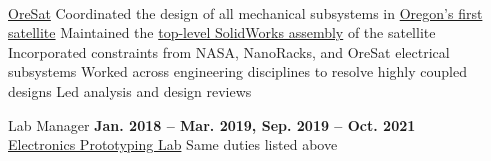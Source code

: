 \begin{innerlist}
    \\ \href{https://www.oresat.org/}{OreSat}
		\subitem Coordinated the design of all mechanical subsystems in \href{http://oresat.org/}{Oregon's first satellite}
		\subitem Maintained the \href{https://github.com/oresat/oresat-structure}{top-level SolidWorks assembly} of the satellite
		\subitem Incorporated constraints from NASA, NanoRacks, and OreSat electrical subsystems
		\subitem Worked across engineering disciplines to resolve highly coupled designs
		\subitem Led analysis and design reviews 
    \item Lab Manager \hfill\textbf{Jan. 2018 -- Mar. 2019, Sep. 2019 -- Oct. 2021}
    \\ \href{https://psu-epl.github.io/}{Electronics Prototyping Lab}
        \subitem Same duties listed above
	\end{innerlist}


